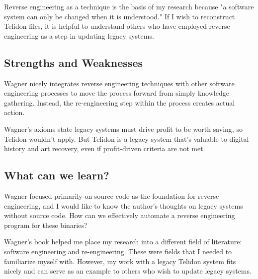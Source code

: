 \documentclass[sigconf]{acmart}
\begin{document}
Reverse engineering as a technique is the basis of my research because "a software system can only be changed when it is understood." If I wish to reconstruct Telidon files, it is helpful to understand others who have employed reverse engineering as a step in updating legacy systems. 

\subsection{Strengths and Weaknesses}

Wagner nicely integrates reverse engineering techniques with other software engineering processes to move the process forward from simply knowledge gathering. Instead, the re-engineering step within the process creates actual action.

Wagner's axioms state legacy systems must drive profit to be worth saving, so Telidon wouldn't apply. But Telidon is a legacy system that's valuable to digital history and art recovery, even if profit-driven criteria are not met.

\subsection{What can we learn?}

Wagner focused primarily on source code as the foundation for reverse engineering, and I would like to know the author's thoughts on legacy systems without source code. How can we effectively automate a reverse engineering program for these binaries?

Wagner's book helped me place my research into a different field of literature: software engineering and re-engineering. These were fields that I needed to familiarize myself with. However, my work with a legacy Telidon system fits nicely and can serve as an example to others who wish to update legacy systems.
\end{document}
